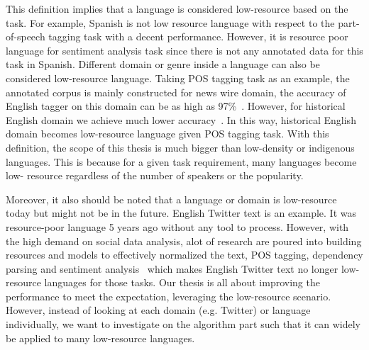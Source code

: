 \documentclass[12pt,twoside,final,hidelinks]{ltthesis}
\theoremstyle{definition}
\begin{document}
This definition implies that a language is considered low-resource based on the task. 
For example, Spanish is not low resource language with respect to 
the part-of-speech tagging task with a decent performance. However, it is 
resource poor language for sentiment analysis task 
since  there is not any annotated data for this task in Spanish. 
Different domain or genre inside a language can also be considered low-resource 
language. Taking POS tagging task as an example, the annotated corpus is mainly 
constructed for news wire domain, the accuracy of English tagger on this domain 
can be as high as 97\%~\cite{Toutanova:2003}. However, for historical English 
domain we achieve much lower accuracy~\cite{yang-eisenstein:2016:N16-1}. In this way, 
historical English domain becomes low-resource language given POS tagging task. 
With this definition, the scope of this thesis is much bigger than low-density or indigenous languages. 
This is because for a given task requirement, many languages become low-
resource regardless of the number of speakers or the popularity.%

Moreover, it also should be noted that a language or domain is low-resource today but might not be in the future. English Twitter text is an example. It was resource-poor language 5 years ago without any tool to process. However, with the high demand on social data analysis, alot of research are poured into  building resources and models to effectively normalized the text, POS tagging, dependency parsing and sentiment analysis~\cite{han-baldwin:2011:ACL-HLT2011,gimpel-EtAl:2011:ACL-HLT2011,kong-EtAl:2014:EMNLP2014,Agarwal:2011:SAT:2021109.2021114} which makes English Twitter text no longer low-resource languages for those tasks. Our thesis is all about improving the performance to meet the expectation, leveraging the low-resource scenario. However, instead of looking at each domain (e.g. Twitter) or language individually, we want to investigate on the algorithm part such that it can widely be applied to many low-resource languages.   
\end{document}
